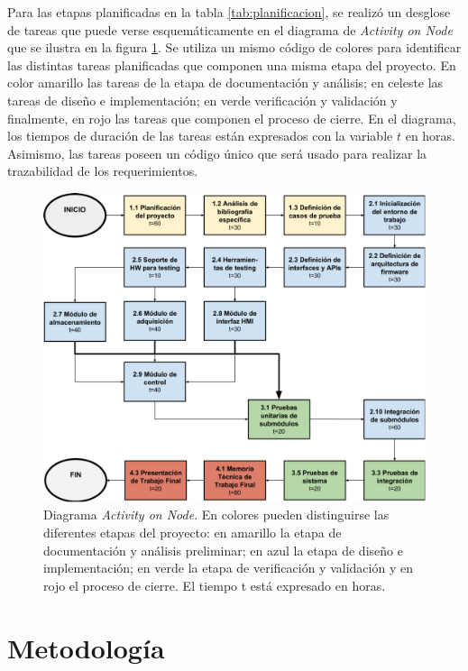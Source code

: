 Para las etapas planificadas en la tabla \ref{tab:planificacion}, se realizó un desglose de tareas que puede verse esquemáticamente en el diagrama de \textit{Activity on Node} que se ilustra en la figura \ref{fig:AoN}. Se utiliza un mismo código de colores para identificar las distintas tareas planificadas que componen una misma etapa del proyecto. En color amarillo las tareas de la etapa de documentación y análisis; en celeste las tareas de diseño e implementación; en verde verificación y validación y finalmente, en rojo las tareas que componen el proceso de cierre. En el diagrama, los tiempos de duración de las tareas están expresados con la variable $t$ en horas. Asimismo, las tareas poseen un código único que será usado para realizar la trazabilidad de los requerimientos.

\begin{figure}[h]
	\centering
	\includegraphics[width=\textwidth]{./Figures/AoN.pdf}
	\caption[Diagrama \textit{Activity on Node}.]{Diagrama \textit{Activity on Node}.  En colores pueden distinguirse las diferentes etapas del proyecto: en amarillo la etapa de documentación y análisis preliminar; en azul la etapa de diseño e implementación; en verde la etapa de verificación y validación y en rojo el proceso de cierre. El tiempo t está expresado en horas.}
	\label{fig:AoN}
\end{figure}

\clearpage
\section{Metodología}

